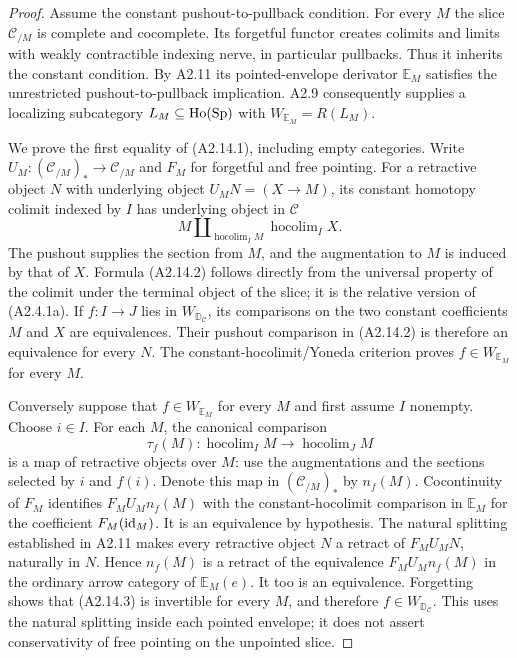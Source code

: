 \begin{proof}
Assume the constant pushout-to-pullback condition. For every $M$ the
slice $\mathcal C_{/M}$ is complete and cocomplete. Its forgetful functor
creates colimits and limits with weakly contractible indexing nerve,
in particular pullbacks. Thus it inherits the constant condition.
By A2.11 its pointed-envelope derivator $\mathbb E_M$ satisfies the
unrestricted pushout-to-pullback implication. A2.9 consequently supplies
a localizing subcategory $L_M\subseteq\mathrm{Ho}(\mathrm{Sp})$ with
$W_{\mathbb E_M}=R(L_M)$.

We prove the first equality of (A2.14.1), including empty categories.
Write $U_M:(\mathcal C_{/M})_*\to\mathcal C_{/M}$ and $F_M$ for
forgetful and free pointing. For a retractive object $N$ with underlying
object $U_MN=(X\to M)$, its constant homotopy colimit indexed by $I$
has underlying object in $\mathcal C$
\[
 M\amalg_{\operatorname{hocolim}_I M}
                 \operatorname{hocolim}_I X.
 \tag{A2.14.2}
\]
The pushout supplies the section from $M$, and the augmentation to $M$
is induced by that of $X$. Formula (A2.14.2) follows directly from the universal property of the
colimit under the terminal object of the slice; it is the relative
version of (A2.4.1a). If $f:I\to J$ lies in
$W_{\mathbb D_{\mathcal C}}$, its comparisons on the two constant
coefficients $M$ and $X$ are equivalences. Their pushout comparison in
(A2.14.2) is therefore an equivalence for every $N$. The
constant-hocolimit/Yoneda criterion proves
$f\in W_{\mathbb E_M}$ for every $M$.

Conversely suppose that $f\in W_{\mathbb E_M}$ for every $M$ and first
assume $I$ nonempty. Choose $i\in I$. For each $M$, the canonical
comparison
\[
 \tau_f(M):\operatorname{hocolim}_I M\longrightarrow
                   \operatorname{hocolim}_J M
 \tag{A2.14.3}
\]
is a map of retractive objects over $M$: use the augmentations and the
sections selected by $i$ and $f(i)$. Denote this map in
$(\mathcal C_{/M})_*$ by $n_f(M)$. Cocontinuity of $F_M$ identifies
$F_MU_M n_f(M)$ with the constant-hocolimit comparison in $\mathbb E_M$
for the coefficient $F_M(\operatorname{id}_M)$. It is an equivalence by hypothesis.
The natural splitting established in A2.11 makes every retractive object
$N$ a retract of $F_MU_MN$, naturally in $N$. Hence $n_f(M)$ is a retract
of the equivalence $F_MU_M n_f(M)$ in the ordinary arrow category
of $\mathbb E_M(e)$.
It too is an equivalence. Forgetting shows that (A2.14.3) is invertible
for every $M$, and therefore $f\in W_{\mathbb D_{\mathcal C}}$.
This uses the natural splitting inside each pointed envelope; it does
not assert conservativity of free pointing on the unpointed slice.


\end{proof}
